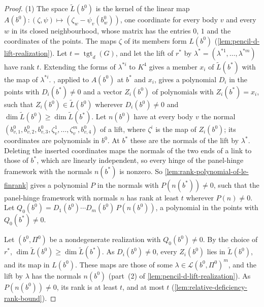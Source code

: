 \begin{proof}
  \leanok
  (1) The space $\widetilde L(b^0)$ is the kernel of the linear map
  $A(b^0) \colon (\zeta, \psi) \mapsto (\zeta_w - \psi_v(b^0_w))$, one
  coordinate for every body $v$ and every $w$ in its closed neighbourhood,
  whose matrix has the entries $0$, $1$ and the coordinates of the points.
  The maps $\zeta$ of its members form $L(b^0)$
  (\cref{lem:pencil-d-lift-realization}). Let
  $t = \operatorname{tgt}_d(G)$, and let the lift of $r^*$ by
  $\lambda^* = (\lambda^{*1}, \dots, \lambda^{*m})$ have rank $t$.
  Extending the forms of $\lambda^{*i}$ to $K^4$ gives a member $x_i$ of
  $\widetilde L(b^*)$ with the map of $\lambda^{*i}$.
  , applied to $A(b^0)$ at $b^*$ and
  $x_i$, gives a polynomial $D_i$ in the points with $D_i(b^*) \ne 0$ and
  a vector $Z_i(b^0)$ of polynomials with $Z_i(b^*) = x_i$, such that
  $Z_i(b^0) \in \widetilde L(b^0)$ wherever $D_i(b^0) \ne 0$ and
  $\dim \widetilde L(b^0) \ge \dim \widetilde L(b^*)$. Let $n(b^0)$ have
  at every body $v$ the normal
  $(b^0_{v,1}, b^0_{v,2}, b^0_{v,3}, \zeta^1_v, \dots, \zeta^m_v,
  b^0_{v,4})$ of a lift, where $\zeta^i$ is the map of $Z_i(b^0)$; its
  coordinates are polynomials in $b^0$. At $b^*$ these are the normals
  of the lift by $\lambda^*$. Deleting the
  inserted coordinates maps the normals of the two ends of a link to
  those of $b^*$, which are linearly independent, so every hinge of the
  panel-hinge framework with the normals $n(b^*)$ is nonzero. So
  \cref{lem:rank-polynomial-of-le-finrank} gives a polynomial $P$ in the
  normals with $P(n(b^*)) \ne 0$, such that the panel-hinge framework
  with normals $n$ has rank at least $t$ wherever $P(n) \ne 0$. Let
  $Q_0(b^0) = D_1(b^0) \cdots D_m(b^0)\, P(n(b^0))$, a polynomial in the
  points with $Q_0(b^*) \ne 0$.

  Let $(b^0, \Pi^0)$ be a nondegenerate realization with
  $Q_0(b^0) \ne 0$. By the choice of $r^*$,
  $\dim \widetilde L(b^0) \ge \dim \widetilde L(b^*)$. As
  $D_i(b^0) \ne 0$, every $Z_i(b^0)$ lies in $\widetilde L(b^0)$, and its
  map in $L(b^0)$. These maps are those of some
  $\lambda \in \mathcal{L}(b^0, \Pi^0)^m$, and the lift by $\lambda$ has
  the normals $n(b^0)$ (part~(2) of
  \cref{lem:pencil-d-lift-realization}). As $P(n(b^0)) \ne 0$, its rank
  is at least $t$, and at most $t$
  (\cref{lem:relative-deficiency-rank-bound}).


\end{proof}
